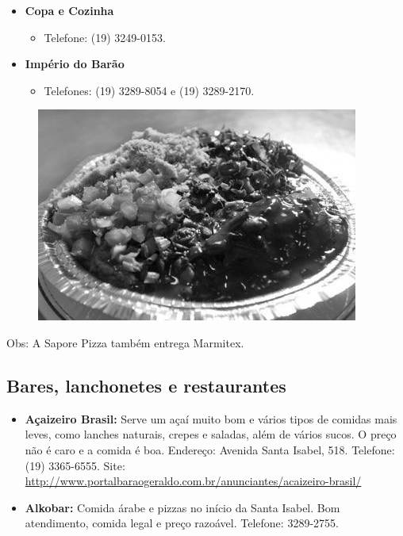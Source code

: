 \begin{itemize}
\item  \textbf{Copa e Cozinha}
\begin{itemize}
\item  Telefone: (19) 3249-0153.
\end{itemize}
\end{itemize}

\begin{itemize}
\item  \textbf{Império do Barão}
\begin{itemize}
\item  Telefones: (19) 3289-8054 e (19) 3289-2170.
\end{itemize}
\end{itemize}

\begin{figure}[t!]
    \centering
    \includegraphics[scale=0.55,keepaspectratio=true]{img/imgs/6-comida/marmitex.jpg}
\end{figure}

Obs: A Sapore Pizza também entrega Marmitex.

\subsection{Bares, lanchonetes e restaurantes}
\begin{itemize}
\item  \textbf{Açaizeiro Brasil:} Serve um açaí muito bom e vários tipos de comidas mais leves, como lanches naturais, crepes e saladas, além de vários sucos. O preço não é caro e a comida é boa. Endereço: Avenida Santa Isabel, 518. Telefone: (19) 3365-6555. Site: \url{http://www.portalbaraogeraldo.com.br/anunciantes/acaizeiro-brasil/}
\end{itemize}

\begin{itemize}
\item  \textbf{Alkobar:} Comida árabe e pizzas no início da Santa Isabel. Bom atendimento, comida legal e preço razoável. Telefone: 3289-2755.
\end{itemize}

